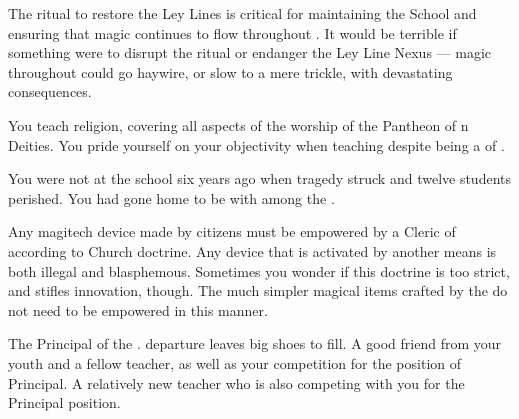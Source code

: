 \documentclass[char]{GL2020}
\begin{document}
\begin{itemz}[Notes]
    \item The ritual to restore the Ley Lines is critical for maintaining the School and ensuring that magic continues to flow throughout \pEarth{}. It would be terrible if something were to disrupt the ritual or endanger the Ley Line Nexus — magic throughout \pEarth{} could go haywire, or slow to a mere trickle, with devastating consequences. 
    \item You teach religion, covering all aspects of the worship of the Pantheon of \pEarth{}n Deities. You pride yourself on your objectivity when teaching despite being a \cBeetle{\cleric} of \cTechGod{}.
    \item You were not at the school six years ago when tragedy struck and twelve students perished. You had gone home to be with \cJuniorStatesman{} among the \pShip{}.
    \item Any magitech device made by \pTech{} citizens must be empowered by a Cleric of \cTechGod{} according to Church doctrine. Any device that is activated by another means is both illegal and blasphemous. Sometimes you wonder if this doctrine is too strict, and stifles innovation, though. The much simpler magical items crafted by the \pShippies{} do not need to be empowered in this manner.
\end{itemz}

\begin{contacts}
    \contact{\cPrincipal{}} The Principal of the \pSchool{}. \cPrincipal{\Their} departure leaves big shoes to fill.
    \contact{\cMusic{}} A good friend from your youth and a fellow teacher, as well as your competition for the position of Principal.
    \contact{\cChupSecond{}} A relatively new teacher who is also competing with you for the Principal position. 
\end{contacts}
\end{document}
